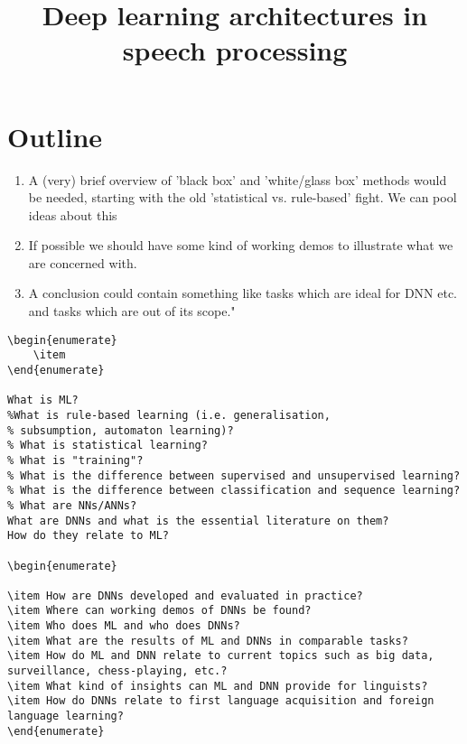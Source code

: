 \documentclass[12pt, titlepage, reqno]{article}
\title{Deep learning architectures in speech processing}
\begin{document}
\maketitle 


\section{Outline}
\begin{enumerate}
	\item A (very) brief overview of 'black box' and 'white/glass box' methods would be needed, starting with the old 'statistical vs. rule-based' fight. We can pool ideas about this
	\item If possible we should have some kind of working demos to illustrate what we are concerned with.
	\item A conclusion could contain something like tasks which are ideal for DNN etc. and tasks which are out of its scope."
\end{enumerate}
\begin{verbatim} 
\begin{enumerate}
	\item 
\end{enumerate}

What is ML?
%What is rule-based learning (i.e. generalisation, 
% subsumption, automaton learning)?
% What is statistical learning?
% What is "training"?
% What is the difference between supervised and unsupervised learning?
% What is the difference between classification and sequence learning?
% What are NNs/ANNs?
What are DNNs and what is the essential literature on them?
How do they relate to ML?

\begin{enumerate}

\item How are DNNs developed and evaluated in practice?
\item Where can working demos of DNNs be found?
\item Who does ML and who does DNNs?
\item What are the results of ML and DNNs in comparable tasks?
\item How do ML and DNN relate to current topics such as big data, 
surveillance, chess-playing, etc.?
\item What kind of insights can ML and DNN provide for linguists?
\item How do DNNs relate to first language acquisition and foreign 
language learning? 
\end{enumerate}
\end{verbatim}
\end{document}
